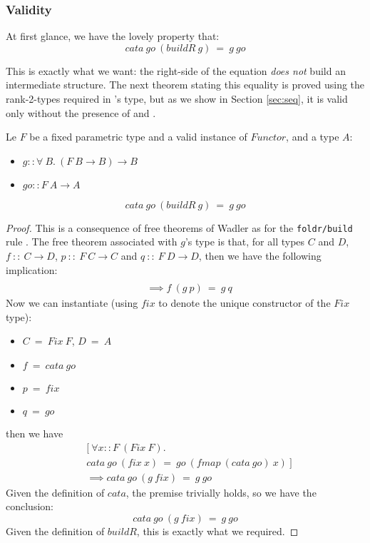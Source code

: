 \subsubsection{Validity}
At first glance, we have the lovely property that:
$$cata\ go\ (buildR\ g)\ =\ g\ go$$

This is exactly what we want: the right-side of the equation \emph{does not} build an intermediate structure. The next theorem stating this equality is proved using the rank-2-types required in 's type, but as we show in Section   \ref{sec:seq}, it is valid only without the presence of  and .

\begin{theorem}
Le $F$ be a fixed parametric type and a valid instance of $Functor$, and a type $A$:
\begin{itemize}
	\item $g :: \forall\ B.\ (F\ B \to B) \to B$
	\item $go :: F\ A \to A $
\end{itemize}
$$cata\ go\ (buildR\ g)\ =\ g\ go$$
\end{theorem}
\begin{proof}
This is a consequence of free theorems of Wadler \cite{Wadler:1989:TF:99370.99404} as for the \verb|foldr/build| rule \cite{Gill:1993:SCD:165180.165214}. The free theorem associated with $g$'s type is that, for all types $C$ and $D$, $f\ ::\ C \to D$, $p\ ::\ F\ C \to C$ and $q\ ::\ F\ D \to D$, then we have the following implication:
\begin{align*}
[\ \forall& x::C.\ f\ (p\ x)\ =\ q\ (fmap\ f\ x)\ ]\\
&\implies f\ (g\ p)\ =\ g\ q
\end{align*}
Now we can instantiate (using $fix$ to denote the unique constructor of the $Fix$ type):
\begin{itemize}
	\item $C\ =\ Fix\ F$, $D\ =\ A$
	\item $f\ =\ cata\ go$
	\item $p\ =\ fix$
	\item $q\ =\ go$
\end{itemize}
then we have
\begin{align*}
&[\ \forall x::F\ (Fix\ F).\\
&cata\ go\ (fix\ x)\ =\ go\ (fmap\ (cata\ go)\ x)\ ]\\
&\implies cata\ go\ (g\ fix)\ =\ g\ go
\end{align*}
Given the definition of $cata$, the premise trivially holds, so we have the conclusion:
$$cata\ go\ (g\ fix)\ =\ g\ go$$
Given the definition of $buildR$, this is exactly what we required.
\end{proof}

